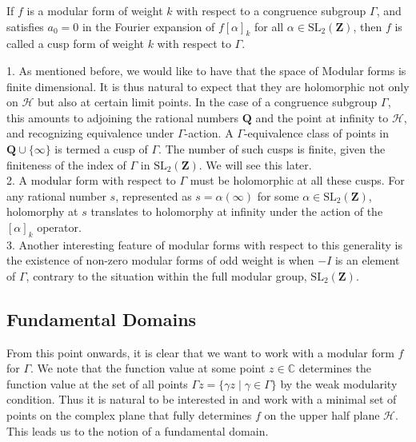 \begin{definition}
If $f$ is a modular form of weight $k$ with respect to a congruence subgroup $\Gamma$, and satisfies $a_{0}=0$ in the Fourier expansion of $f[\alpha]_{k}$ for all $\alpha \in \mathrm{SL}_{2}(\mathbf{Z})$,
then $f$ is called a cusp form of weight $k$ with respect to $\Gamma$.
\end{definition}

\begin{remark}
    1. As mentioned before, we would like to have that the space of Modular forms is finite dimensional. It is thus natural to expect that they are holomorphic not only on \( \mathcal{H} \) but also at certain limit points. In the case of a congruence subgroup \( \Gamma \), this amounts to adjoining the rational numbers \( \mathbf{Q} \) and the point at infinity to \( \mathcal{H} \), and recognizing equivalence under \( \Gamma \)-action. A \( \Gamma \)-equivalence class of points in \( \mathbf{Q} \cup \{\infty\} \) is termed a cusp of \( \Gamma \). The number of such cusps is finite, given the finiteness of the index of \( \Gamma \) in \( \mathrm{SL}_{2}(\mathbf{Z}) \). We will see this later. \\

2. A modular form with respect to \( \Gamma \) must be holomorphic at all these cusps. For any rational number \( s \), represented as \( s = \alpha(\infty) \) for some \( \alpha \in \mathrm{SL}_{2}(\mathbf{Z}) \), holomorphy at \( s \) translates to holomorphy at infinity under the action of the \( [\alpha]_k \) operator. \\

3. Another interesting feature of modular forms with respect to this generality is the existence of non-zero modular forms of odd weight is  when \( -I \) is an element of \( \Gamma \), contrary to the situation within the full modular group, \( \mathrm{SL}_{2}(\mathbf{Z}) \).
\end{remark}

\subsection{Fundamental Domains}

From this point onwards, it is clear that we want to  work with a modular form $f$ for $\Gamma$. We note that the function value at some point $z \in \mathbb{C}$ determines the function value at the set of all points $\Gamma z=\{\gamma z \mid \gamma \in \Gamma\}$ by the weak modularity condition. Thus it is natural to be interested in and work with a minimal set of points on the complex plane that fully determines $f$ on the upper half plane $\mathcal{H}$. This leads us to the notion of a fundamental domain. 

